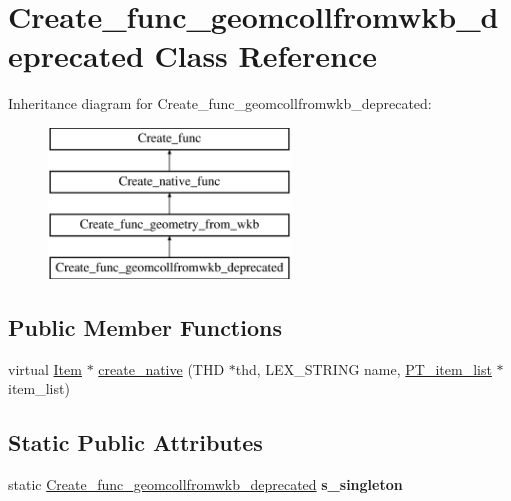 \hypertarget{classCreate__func__geomcollfromwkb__deprecated}{}\section{Create\+\_\+func\+\_\+geomcollfromwkb\+\_\+deprecated Class Reference}
\label{classCreate__func__geomcollfromwkb__deprecated}
Inheritance diagram for Create\+\_\+func\+\_\+geomcollfromwkb\+\_\+deprecated\+:\begin{figure}[H]
\begin{center}
\leavevmode
\includegraphics[height=4.000000cm]{classCreate__func__geomcollfromwkb__deprecated}
\end{center}
\end{figure}
\subsection*{Public Member Functions}
\begin{DoxyCompactItemize}
\item 
virtual \mbox{\hyperlink{classItem}{Item}} $\ast$ \mbox{\hyperlink{classCreate__func__geomcollfromwkb__deprecated_a37dd2357ed2c8bb8f97450aaaa47c158}{create\+\_\+native}} (T\+HD $\ast$thd, L\+E\+X\+\_\+\+S\+T\+R\+I\+NG name, \mbox{\hyperlink{classPT__item__list}{P\+T\+\_\+item\+\_\+list}} $\ast$item\+\_\+list)
\end{DoxyCompactItemize}
\subsection*{Static Public Attributes}
\begin{DoxyCompactItemize}
\item 
\mbox{\label{classCreate__func__geomcollfromwkb__deprecated_ac445e4954fea4336a1cce2c8a8a937bc}} 
static \mbox{\hyperlink{classCreate__func__geomcollfromwkb__deprecated}{Create\+\_\+func\+\_\+geomcollfromwkb\+\_\+deprecated}} {\bfseries s\+\_\+singleton}
\end{DoxyCompactItemize}

